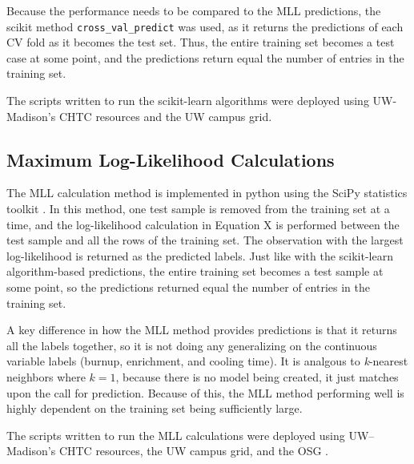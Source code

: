 Because the performance needs to be compared to the \gls{MLL} predictions, the
scikit method \texttt{cross\_val\_predict} was used, as it returns the
predictions of each \gls{CV} fold as it becomes the test set. Thus, the entire
training set becomes a test case at some point, and the predictions return
equal the number of entries in the training set.

The scripts written to run the scikit-learn algorithms were deployed using
\gls{UW}-Madison's \gls{CHTC} resources and the \gls{UW} campus grid. 

\subsection{Maximum Log-Likelihood Calculations}

The \gls{MLL} calculation method is implemented in python using the SciPy
statistics toolkit \cite{scipy}. In this method, one test sample is removed
from the training set at a time, and the log-likelihood calculation in Equation
X  is performed between the test sample and all the rows of
the training set.  The observation with the largest log-likelihood is returned
as the predicted labels. Just like with the scikit-learn algorithm-based 
predictions, the entire training set becomes a test sample at some point, so
the predictions returned equal the number of entries in the training set.

A key difference in how the \gls{MLL} method provides predictions is that it
returns all the labels together, so it is not doing any generalizing on the
continuous variable labels (burnup, enrichment, and cooling time). It is
analgous to \textit{k}-nearest neighbors where $k = 1$, because there is no
model being created, it just matches upon the call for prediction. Because of
this, the \gls{MLL} method performing well is highly dependent on the training
set being sufficiently large. 

The scripts written to run the \gls{MLL} calculations were deployed using
\gls{UW}--Madison's \gls{CHTC} resources, the \gls{UW} campus grid, and the 
\gls{OSG} \cite{osg07, osg09}. 
